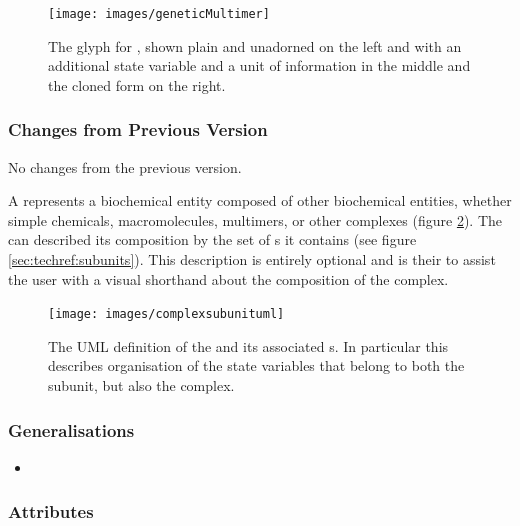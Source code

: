 \begin{figure}[htb]
  \centering
  \texttt{[image: images/geneticMultimer]}
  \caption{The \PD glyph for , shown plain and
    unadorned on the left and with an additional state variable and a
    unit of information in the middle and the cloned form on the right.}
  \label{fig:techref:genetic-multimer}
\end{figure}

\subsubsection{Changes from Previous Version}

No changes from the previous version.


\label{sec:techref:complex}
\label{defn:Complex}

A  represents a biochemical entity composed of
other biochemical entities, whether simple chemicals, macromolecules, multimers, or other complexes (figure
\ref{fig:techref:complexsubunituml}). The  can described
its composition by the set of s it contains (see
figure \ref{sec:techref:subunits}). This description is entirely optional and
is their to assist the user with a visual shorthand about the
composition of the complex.

\begin{figure}[htb]
  \centering
  \texttt{[image: images/complexsubunituml]}
  \caption{The UML definition of the  and its
    associated s. In particular this describes organisation
   of the state variables that belong to both the subunit, but also
   the complex.}
  \label{fig:techref:complexsubunituml}
\end{figure}

\subsubsection{Generalisations}

\begin{itemize}
\item {}
\end{itemize}

\subsubsection{Attributes}


